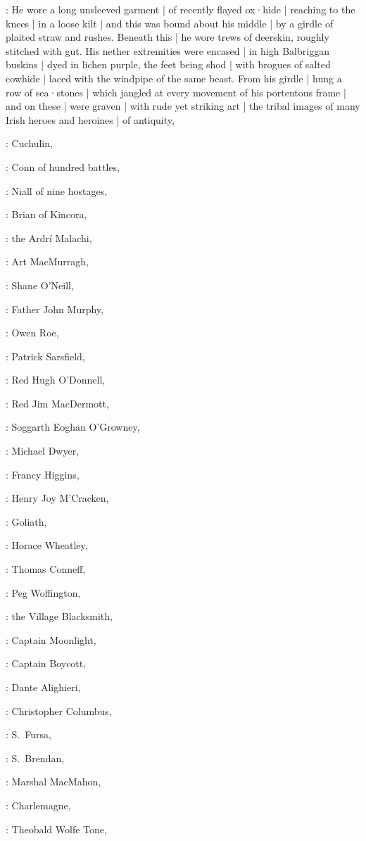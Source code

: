 :
He wore a long unsleeved garment |
of recently flayed ox·hide |
reaching to the knees |
in a loose kilt |
and this was bound about his middle |
by a girdle of plaited straw and rushes.
Beneath this |
he wore trews of deerskin,
roughly stitched with gut.
His nether extremities were encased |
in high Balbriggan buskins |
dyed in lichen purple,
the feet being shod |
with brogues of salted cowhide |
laced with the windpipe of the same beast.
From his girdle |
hung a row of sea·stones |
which jangled at every movement of his portentous frame |
and on these |
were graven |
with rude yet striking art |
the tribal images of many Irish heroes and heroines |
of antiquity,

:
Cuchulin,

:
Conn of hundred battles,

:
Niall of nine hostages,

:
Brian of Kincora,

:
the Ardrí Malachi,

:
Art MacMurragh,

:
Shane O'Neill,

:
Father John Murphy,

:
Owen Roe,

:
Patrick Sarsfield,

:
Red Hugh O'Donnell,

:
Red Jim MacDermott,

:
Soggarth Eoghan O'Growney,

:
Michael Dwyer,

:
Francy Higgins,

:
Henry Joy M'Cracken,

:
Goliath,

:
Horace Wheatley,

:
Thomas Conneff,

:
Peg Woffington,

:
the Village Blacksmith,

:
Captain Moonlight,

:
Captain Boycott,

:
Dante Alighieri,

:
Christopher Columbus,

:
S.~Fursa,

:
S.~Brendan,

:
Marshal MacMahon,

:
Charlemagne,

:
Theobald Wolfe Tone,

